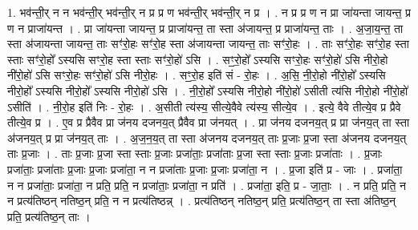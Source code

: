 \documentclass[17pt]{extarticle}
\begin{document}
1. भव॑न्ती॒र् न न भव॑न्ती॒र् भव॑न्ती॒र् न प्र प्र ण भव॑न्ती॒र् भव॑न्ती॒र् न प्र । . न प्र प्र ण न प्रा जा॑यन्ता जायन्त॒ प्र ण न प्राजा॑यन्त । . प्रा जा॑यन्ता जायन्त॒ प्र प्राजा॑यन्त॒ ता स्ता अ॑जायन्त॒ प्र प्राजा॑यन्त॒ ताः । . अ॒जा॒य॒न्त॒ ता स्ता अ॑जायन्ता जायन्त॒ ताः सꣳ॑रो॒हः सꣳ॑रो॒ह स्ता अ॑जायन्ता जायन्त॒ ताः सꣳ॑रो॒हः । . ताः सꣳ॑रो॒हः सꣳ॑रो॒ह स्ता स्ताः सꣳ॑रो॒हो᳚ ऽस्यसि सꣳरो॒ह स्ता स्ताः सꣳ॑रो॒हो॑ ऽसि । . सꣳ॒॒रो॒हो᳚ ऽस्यसि सꣳरो॒हः सꣳ॑रो॒हो॑ ऽसि नीरो॒हो नी॑रो॒हो॑ ऽसि सꣳरो॒हः सꣳ॑रो॒हो॑ ऽसि नीरो॒हः । . सꣳ॒॒रो॒ह इति॑ सं - रो॒हः । . अ॒सि॒ नी॒रो॒हो नी॑रो॒हो᳚ ऽस्यसि नीरो॒हो᳚ ऽस्यसि नीरो॒हो᳚ ऽस्यसि नीरो॒हो॑ ऽसि । . नी॒रो॒हो᳚ ऽस्यसि नीरो॒हो नी॑रो॒हो॑ ऽसीती त्य॑सि नीरो॒हो नी॑रो॒हो॑ ऽसीति॑ । . नी॒रो॒ह इति॑ निः - रो॒हः । . अ॒सीती त्य॑स्य॒ सीत्ये॒वैवे त्य॑स्य॒ सीत्ये॒व । . इत्ये॒ वैवे तीत्ये॒व प्र प्रैवे तीत्ये॒व प्र । . ए॒व प्र प्रैवैव प्रा ज॑नय दजनय॒त् प्रैवैव प्रा ज॑नयत् । . प्रा ज॑नय दजनय॒त् प्र प्रा ज॑नय॒त् ता स्ता अ॑जनय॒त् प्र प्रा ज॑नय॒त् ताः । . अ॒ज॒न॒य॒त् ता स्ता अ॑जनय दजनय॒त् ताः प्र॒जाः प्र॒जा स्ता अ॑जनय दजनय॒त् ताः प्र॒जाः । . ताः प्र॒जाः प्र॒जा स्ता स्ताः प्र॒जाः प्रजा॑ताः॒ प्रजा॑ताः प्र॒जा स्ता स्ताः प्र॒जाः प्रजा॑ताः । . प्र॒जाः प्रजा॑ताः॒ प्रजा॑ताः प्र॒जाः प्र॒जाः प्रजा॑ता॒ न न प्रजा॑ताः प्र॒जाः प्र॒जाः प्रजा॑ता॒ न । . प्र॒जा इति॑ प्र - जाः । . प्रजा॑ता॒ न न प्रजा॑ताः॒ प्रजा॑ता॒ न प्रति॒ प्रति॒ न प्रजा॑ताः॒ प्रजा॑ता॒ न प्रति॑ । . प्रजा॑ता॒ इति॒ प्र - जा॒ताः॒ । . न प्रति॒ प्रति॒ न न प्रत्य॑तिष्ठन् नतिष्ठ॒न् प्रति॒ न न प्रत्य॑तिष्ठन्न् । . प्रत्य॑तिष्ठन् नतिष्ठ॒न् प्रति॒ प्रत्य॑तिष्ठ॒न् ता स्ता अ॑तिष्ठ॒न् प्रति॒ प्रत्य॑तिष्ठ॒न् ताः । \newline
\end{document}

